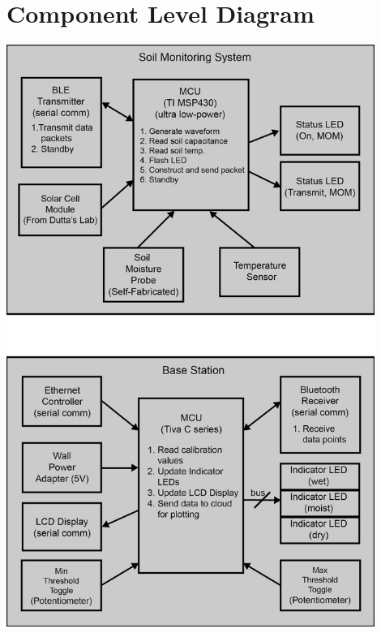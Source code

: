 \documentclass{article}
\begin{document}
\section{Component Level Diagram}
\includegraphics[width=0.9\textwidth]{component_diagram.png}
\end{document}
